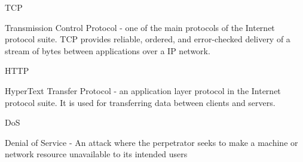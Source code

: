 \documentclass[]{project_plan}
\begin{document}
TCP

Transmission Control Protocol - one of the main protocols of the Internet protocol suite. TCP provides
reliable, ordered, and error-checked delivery of a stream of bytes between applications over a IP network.

HTTP

HyperText Transfer Protocol - an application layer protocol in the Internet protocol suite.
It is used for transferring data between clients and servers.

DoS

Denial of Service - An attack where the perpetrator seeks to make a machine or network resource unavailable
to its intended users




\end{document}
